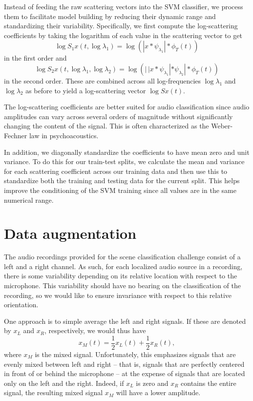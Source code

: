 \documentclass{article}
\newcommand{\lau}{{\lambda_1}}
\newcommand{\lad}{{\lambda_2}}
\begin{document}
\begin{sloppy}
Instead of feeding the raw scattering vectors into the SVM classifier, we process them to facilitate model building by reducing their dynamic range and standardizing their variability. Specifically, we first compute the log-scattering coefficients by taking the logarithm of each value in the scattering vector to get
\begin{equation}
	\log S_1 x(t, \log \lau) = \log \left( | x \ast \psi_\lau | \ast \phi_T(t) \right)
\end{equation}
in the first order and
\begin{equation}
	\log S_2 x(t, \log \lau, \log \lad) = \log \left( |\,| x \ast \psi_\lau | \ast \psi_\lad | \ast \phi_T(t) \right)
\end{equation}
in the second order. These are combined across all log-frequencies $\log \lau$ and $\log \lad$ as before to yield a log-scattering vector $\log Sx(t)$.

The log-scattering coefficients are better suited for audio classification since audio amplitudes can vary across several orders of magnitude without significantly changing the content of the signal. This is often characterized as the Weber-Fechner law in psychoacoustics.

In addition, we diagonally standardize the coefficients to have mean zero and unit variance. To do this for our train-test splits, we calculate the mean and variance for each scattering coefficient across our training data and then use this to standardize both the training and testing data for the current split. This helps improve the conditioning of the SVM training since all values are in the same numerical range.

\section{Data augmentation}
\label{sec:augment}

The audio recordings provided for the scene classification challenge consist of a left and a right channel. As such, for each localized audio source in a recording, there is some variability depending on its relative location with respect to the microphone. This variability should have no bearing on the classification of the recording, so we would like to ensure invariance with respect to this relative orientation.

One approach is to simple average the left and right signals. If these are denoted by $x_L$ and $x_R$, respectively, we would thus have
\begin{equation}
	x_M(t) = \frac{1}{2} x_L(t) + \frac{1}{2} x_R(t),
\end{equation}
where $x_M$ is the mixed signal. Unfortunately, this emphasizes signals that are evenly mixed between left and right -- that is, signals that are perfectly centered in front of or behind the microphone -- at the expense of signals that are located only on the left and the right. Indeed, if $x_L$ is zero and $x_R$ contains the entire signal, the resulting mixed signal $x_M$ will have a lower amplitude.


\end{sloppy}
\end{document}
